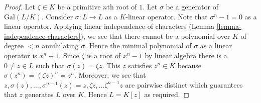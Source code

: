 \documentclass[10pt,a4paper]{amsart}
\theoremstyle{plain}
\theoremstyle{definition}
\theoremstyle{remark}
\numberwithin{equation}{subsection}
\begin{document}
\begin{proof}
Let $\zeta \in K$ be a primitive $n$th root of $1$.
Let $\sigma$ be a generator of $\text{Gal}(L/K)$.
Consider $\sigma : L \to L$ as a $K$-linear operator.
Note that $\sigma^n - 1 = 0$ as a linear operator.
Applying linear independence of characters
(Lemma \ref{lemma-independence-characters}), we see
that there cannot be a polynomial over $K$ of degree $< n$
annihilating $\sigma$. Hence the minimal polynomial of $\sigma$
as a linear operator is $x^n - 1$. 
Since $\zeta$ is a root of $x^n - 1$ by linear algebra
there is a $0 \neq z \in L$ such that $\sigma(z) = \zeta z$.
This $z$ satisfies $z^n \in K$ because
$\sigma(z^n) = (\zeta z)^n = z^n$. Moreover, we see that
$z, \sigma(z), \ldots, \sigma^{n - 1}(z) =
z, \zeta z, \ldots \zeta^{n - 1} z$ are pairwise distinct
which guarantees that $z$ generates $L$ over $K$.
Hence $L = K[z]$ as required.
\end{proof}
\end{document}
